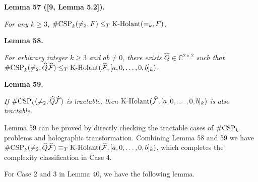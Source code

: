 \documentclass[10pt,a4paper]{article}
\begin{document}


\par\medskip\noindent\textbf{
\textbf{Lemma 57}\textbf{ }([9, Lemma 5.2])\textbf{.}
}\par



\emph{For any $k\geq 3$, $\textup{{\#CSP}}_{k}(\neq_{2},F)\leq_{T}\textup{{K-Holant}}(=_{k},F)$.}\par







\par\medskip\noindent\textbf{
\textbf{Lemma 58}\textbf{.}
}\par



\emph{For arbitrary integer $k\geq 3$ and $ab\neq 0$, there exists $\widehat{Q}\in\mathbb{C}^{2\times 2}$ such that $\textup{{\#CSP}}_{k}(\neq_{2},\widehat{Q}\widehat{\mathcal{F}})\leq_{T}\textup{{K-Holant}}(\widehat{\mathcal{F}},[a,0,\dots,0,b]_{k})$.}\par







\par\medskip\noindent\textbf{
\textbf{Lemma 59}\textbf{.}
}\par



\emph{If $\textup{{\#CSP}}_{k}(\neq_{2},\widehat{Q}\widehat{\mathcal{F}})$ is tractable, then $\textup{{K-Holant}}(\widehat{\mathcal{F}},[a,0,\dots,0,b]_{k})$ is also tractable.}\par






Lemma 59 can be proved by directly checking the tractable cases of $\textup{{\#CSP}}_{k}$ problems and holographic transformation. Combining Lemma 58 and 59 we have $\textup{{\#CSP}}_{k}(\neq_{2},\widehat{Q}\widehat{\mathcal{F}})\equiv_{T}\textup{{K-Holant}}(\widehat{\mathcal{F}},[a,0,\dots,0,b]_{k})$, which completes the complexity classification in Case 4.\par




For Case 2 and 3 in Lemma 40, we have the following lemma.\par
\end{document}
